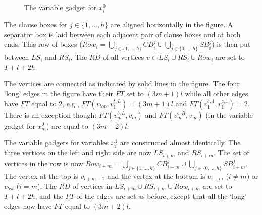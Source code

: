\documentclass[envcountsame]{llncs}
\begin{document}
\begin{figure}[h]
\caption{The variable gadget for $x^0_i$}
\label{fig:vargadget}
\end{figure}

The clause boxes for $j \in \{1, \ldots, h\}$ are aligned horizontally in the figure.
A separator box is laid between each adjacent pair of clause boxes and at both ends.
This row of boxes (\(\mathit{Row}_i = \bigcup_{j \in \{1, \ldots, h\}} \mathit{CB}_i^j \cup \bigcup_{j \in \{0, \ldots, h\}} \mathit{SB}_i^j\))
is then put between $\mathit{LS}_i$ and $\mathit{RS}_i$.
The $\mathit{RD}$ of all vertices
$v \in \mathit{LS}_i \cup \mathit{RS}_i \cup \mathit{Row}_i$ are set to $T + l + 2h$.

The vertices are connected as indicated by solid lines in the figure.
The four `long' edges in the figure have their $\mathit{FT}$ set to $(3m+1)l$
while all other edges have $\mathit{FT}$ equal to $2$, e.g.,
$\mathit{FT}(v_{top}, v^{t, L}_1)  = (3m + 1)l$ and $\mathit{FT}(v^{b, 1}_1, v^{c, 1}_1) = 2$.
There is an exception though: $\mathit{FT}(v_m^{b, L}, v_m)$ and $\mathit{FT}(v_m^{b, R}, v_m)$
(in the variable gadget for $x^0_m$) are equal to $(3m + 2)l$.

The variable gadgets for variables $x^1_i$ are constructed almost identically.
The three vertices on the left and right side are now $\mathit{LS}_{i+m}$ and $\mathit{RS}_{i+m}$.
The set of vertices in the row is now
\(\mathit{Row}_{i + m} = \bigcup_{j \in \{1, \ldots, h\}} \mathit{CB}_{i + m}^j \cup \bigcup_{j \in \{0, \ldots, h\}} \mathit{SB}_{i + m}^j\).
The vertex at the top is $v_{i + m - 1}$ and the vertex at the bottom is $v_{i + m}$ ($i \neq m$)
or $v_{bot}$ ($i = m$). The $\mathit{RD}$ of vertices in
$\mathit{LS}_{i + m} \cup \mathit{RS}_{i + m} \cup \mathit{Row}_{i + m}$ are set to $T + l + 2h$,
and the $\mathit{FT}$ of the edges are set as before, except that all
the `long' edges now have $\mathit{FT}$ equal to $(3m+2)l$.
\end{document}
